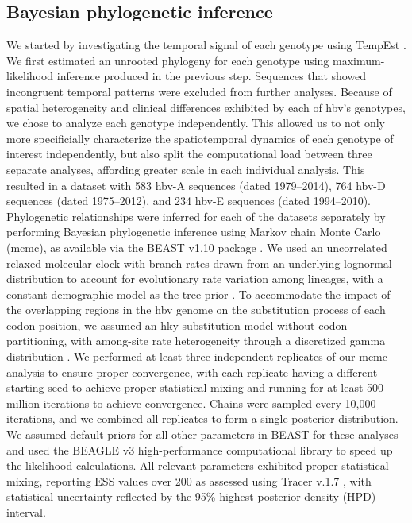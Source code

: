 \subsection{Bayesian phylogenetic inference}
We started by investigating the temporal signal of each genotype using TempEst \citep{rambaut2016exploring}.
We first estimated an unrooted phylogeny for each genotype using maximum-likelihood inference produced in the previous step.
Sequences that showed incongruent temporal patterns were excluded from further analyses.
Because of spatial heterogeneity and clinical differences exhibited by each of \gls{hbv}'s genotypes, we chose to analyze each genotype independently.
This allowed us to not only more specificially characterize the spatiotemporal dynamics of each genotype of interest independently, but also split the computational load between three separate analyses, affording greater scale in each individual analysis.
This resulted in a dataset with 583 \gls{hbv}-A sequences (dated 1979--2014), 764 \gls{hbv}-D sequences (dated 1975--2012), and 234 \gls{hbv}-E sequences (dated 1994--2010).
Phylogenetic relationships were inferred for each of the datasets separately by performing Bayesian phylogenetic inference using Markov chain Monte Carlo (\gls{mcmc}), as available via the BEAST v1.10 package \citep{suchard2018bayesian}.
We used an uncorrelated relaxed molecular clock with branch rates drawn from an underlying lognormal distribution to account for evolutionary rate variation among lineages, with a constant demographic model as the tree prior \citep{kingman1982coalescent,drummond2002estimating}.
To accommodate the impact of the overlapping regions in the \gls{hbv} genome on the substitution process of each codon position, we assumed an \gls{hky} substitution model \citep{hasegawa1985dating} without codon partitioning, with among-site rate heterogeneity through a discretized gamma distribution \citep{yang1994maximum}.
We performed at least three independent replicates of our \gls{mcmc} analysis to ensure proper convergence, with each replicate having a different starting seed to achieve proper statistical mixing and running for at least 500 million iterations to achieve convergence.
Chains were sampled every 10,000 iterations, and we combined all replicates to form a single posterior distribution.
We assumed default priors for all other parameters in BEAST for these analyses and used the BEAGLE v3 \citep{suchard2009many-core} high-performance computational library to speed up the likelihood calculations.
All relevant parameters exhibited proper statistical mixing, reporting ESS values over 200 as assessed using Tracer v.1.7 \citep{rambaut2018posterior}, with statistical uncertainty reflected by the 95\% highest posterior density (HPD) interval.

